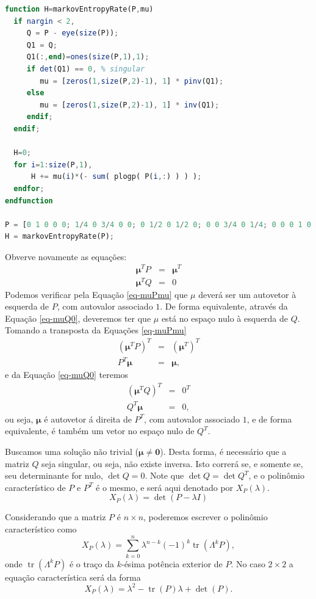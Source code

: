 \begin{questions}
\begin{solution}
\begin{parts}
\begin{lstlisting}[language=Octave]
function H=markovEntropyRate(P,mu)
  if nargin < 2,
     Q = P - eye(size(P));
     Q1 = Q;
     Q1(:,end)=ones(size(P,1),1); 
     if det(Q1) == 0, % singular
        mu = [zeros(1,size(P,2)-1), 1] * pinv(Q1);
     else
        mu = [zeros(1,size(P,2)-1), 1] * inv(Q1);
     endif;
  endif;

  H=0;
  for i=1:size(P,1),
      H += mu(i)*(- sum( plogp( P(i,:) ) ) );
  endfor;
endfunction

P = [0 1 0 0 0; 1/4 0 3/4 0 0; 0 1/2 0 1/2 0; 0 0 3/4 0 1/4; 0 0 0 1 0];
H = markovEntropyRate(P);
\end{lstlisting}

Obverve novamente as equações:
\begin{eqnarray}
\mathbf{\mu}^T P &=& \mathbf{\mu}^T \label{eq-muPmu} \nonumber \\
\mathbf{\mu}^T Q &=& 0 \label{eq-muQ0}
\end{eqnarray}
Podemos verificar pela Equação \ref{eq-muPmu} que $\mu$ deverá ser um autovetor
à esquerda de $P$, com autovalor associado $1$. De forma equivalente, através
da Equação \ref{eq-muQ0}, deveremos ter que $\mu$ está no espaço nulo à esquerda de $Q$.
Tomando a transposta da Equações \ref{eq-muPmu}
\begin{eqnarray}
( \mathbf{\mu}^T P )^T &=& ( \mathbf{\mu}^T )^T \nonumber \\
P^T \mathbf{\mu} &=& \mathbf{\mu} \label{eq-muPmuT}  ,
\end{eqnarray}
e da Equação \ref{eq-muQ0} teremos
\begin{eqnarray}
( \mathbf{\mu}^T Q)^T &=& 0^T \nonumber \\
Q^T \mathbf{\mu} &=& 0 \label{eq-muQ0T} ,
\end{eqnarray}
ou seja, $\mathbf{\mu}$ é autovetor á direita de $P^T$, com autovalor associado $1$,
e de forma equivalente, é também um vetor no espaço nulo de $Q^T$.

Buscamos uma solução não trivial ($\mathbf{\mu} \neq \mathbf{0}$). Desta forma, é necessário
que a matriz $Q$ seja singular, ou seja, não existe inversa. Isto correrá se, e somente se,
seu determinante for nulo, $\det Q = 0$. Note que $\det Q = \det Q^T$, e o polinômio
característico de $P$ e $P^T$ é o mesmo, e será aqui denotado por $X_P(\lambda)$.
\begin{equation}
X_P(\lambda) = \det(P - \lambda I)
\end{equation}

Considerando que a matriz $P$ é $n \times n$, poderemos escrever o polinômio característico
como
\begin{equation}
X_P(\lambda) = \sum_{k=0}^n \lambda^{n-k} (-1)^k \operatorname{tr}(\Lambda^k P) ,
\end{equation}
onde $\operatorname{tr}(\Lambda^k P)$ é o traço da $k$-ésima potência exterior de $P$.
No caso $2 \times 2$ a equação característica será da forma
\begin{equation}
X_P(\lambda) = \lambda^2 - \operatorname{tr}(P) \lambda + \det(P) .
\end{equation}


\end{parts}
\end{solution}
\end{questions}
